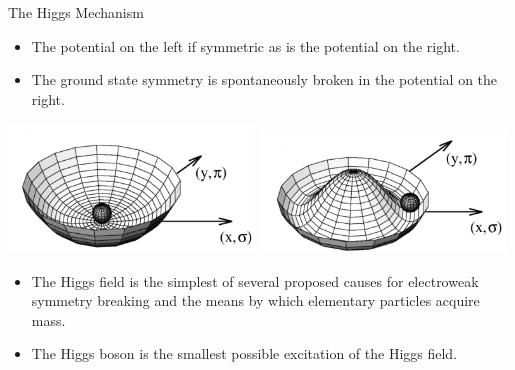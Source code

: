 \begin{frame}{The Higgs Mechanism}
\scriptsize
\begin{itemize}
\item
  The potential on the left if symmetric as is the potential on the right.
\item
  The ground state symmetry is spontaneously broken in the potential on the right.
\end{itemize}
\begin{center}
\includegraphics[width=0.49\textwidth]{images/higgs_mechanism.png}
\includegraphics[width=0.49\textwidth]{images/higgs_mechanism_broken.png}
\end{center}
\begin{itemize}
\item
The Higgs field is the simplest of several proposed causes for electroweak symmetry breaking and the means by which elementary particles acquire mass.
\item
The Higgs boson is the smallest possible excitation of the Higgs field.
\end{itemize}
\end{frame}





